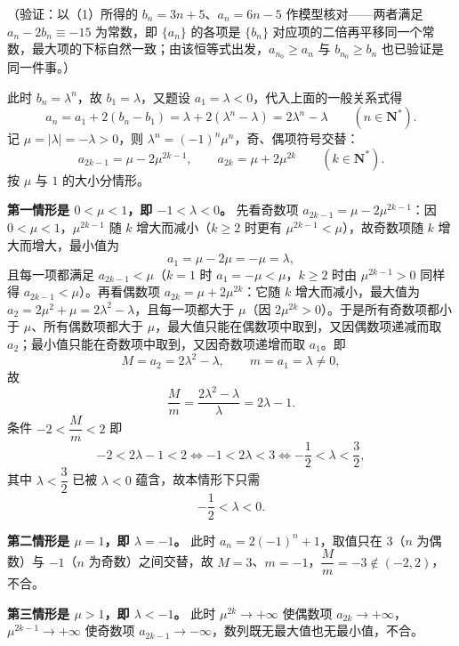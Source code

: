 \begin{answer}
（验证：以（1）所得的 \(b_{n}=3n+5\)、\(a_{n}=6n-5\) 作模型核对——两者满足 \(a_{n}-2b_{n}\equiv-15\) 为常数，即 \(\{a_{n}\}\) 的各项是 \(\{b_{n}\}\) 对应项的二倍再平移同一个常数，最大项的下标自然一致；由该恒等式出发，\(a_{n_{0}}\geqslant a_{n}\) 与 \(b_{n_{0}}\geqslant b_{n}\) 也已验证是同一件事。）


此时 \(b_{n}=\lambda^{n}\)，故 \(b_{1}=\lambda\)，又题设 \(a_{1}=\lambda<0\)，代入上面的一般关系式得
\nopagebreak[4]
\[
a_{n}=a_{1}+2(b_{n}-b_{1})=\lambda+2(\lambda^{n}-\lambda)=2\lambda^{n}-\lambda\qquad(n\in\mathbf{N}^{*}).
\]
记 \(\mu=|\lambda|=-\lambda>0\)，则 \(\lambda^{n}=(-1)^{n}\mu^{n}\)，奇、偶项符号交替：
\nopagebreak[4]
\[
a_{2k-1}=\mu-2\mu^{2k-1},\qquad a_{2k}=\mu+2\mu^{2k}\qquad(k\in\mathbf{N}^{*}).
\]
按 \(\mu\) 与 \(1\) 的大小分情形。

\textbf{第一情形是 \(0<\mu<1\)，即 \(-1<\lambda<0\)。} 先看奇数项 \(a_{2k-1}=\mu-2\mu^{2k-1}\)：因 \(0<\mu<1\)，\(\mu^{2k-1}\) 随 \(k\) 增大而减小（\(k\geqslant 2\) 时更有 \(\mu^{2k-1}<\mu\)），故奇数项随 \(k\) 增大而增大，最小值为
\nopagebreak[4]
\[
a_{1}=\mu-2\mu=-\mu=\lambda,
\]
且每一项都满足 \(a_{2k-1}<\mu\)（\(k=1\) 时 \(a_{1}=-\mu<\mu\)，\(k\geqslant 2\) 时由 \(\mu^{2k-1}>0\) 同样得 \(a_{2k-1}<\mu\)）。再看偶数项 \(a_{2k}=\mu+2\mu^{2k}\)：它随 \(k\) 增大而减小，最大值为 \(a_{2}=2\mu^{2}+\mu=2\lambda^{2}-\lambda\)，且每一项都大于 \(\mu\)（因 \(2\mu^{2k}>0\)）。于是所有奇数项都小于 \(\mu\)、所有偶数项都大于 \(\mu\)，最大值只能在偶数项中取到，又因偶数项递减而取 \(a_{2}\)；最小值只能在奇数项中取到，又因奇数项递增而取 \(a_{1}\)。即
\nopagebreak[4]
\[
M=a_{2}=2\lambda^{2}-\lambda,\qquad m=a_{1}=\lambda\neq0,
\]
故
\nopagebreak[4]
\[
\frac{M}{m}=\frac{2\lambda^{2}-\lambda}{\lambda}=2\lambda-1.
\]
条件 \(-2<\dfrac{M}{m}<2\) 即
\nopagebreak[4]
\[
-2<2\lambda-1<2\iff-1<2\lambda<3\iff-\frac{1}{2}<\lambda<\frac{3}{2},
\]
其中 \(\lambda<\dfrac{3}{2}\) 已被 \(\lambda<0\) 蕴含，故本情形下只需
\nopagebreak[4]
\[
-\frac{1}{2}<\lambda<0.
\]

\textbf{第二情形是 \(\mu=1\)，即 \(\lambda=-1\)。} 此时 \(a_{n}=2(-1)^{n}+1\)，取值只在 \(3\)（\(n\) 为偶数）与 \(-1\)（\(n\) 为奇数）之间交替，故 \(M=3\)、\(m=-1\)，\(\dfrac{M}{m}=-3\notin(-2,2)\)，不合。

\textbf{第三情形是 \(\mu>1\)，即 \(\lambda<-1\)。} 此时 \(\mu^{2k}\to+\infty\) 使偶数项 \(a_{2k}\to+\infty\)，\(\mu^{2k-1}\to+\infty\) 使奇数项 \(a_{2k-1}\to-\infty\)，数列既无最大值也无最小值，不合。


\end{answer}
